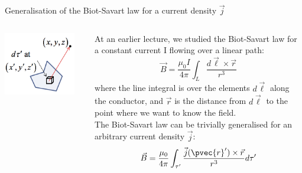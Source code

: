 \begin{frame}{Generalisation of the Biot-Savart law for a current density $\vec{j}$}

\begin{columns}
  \begin{column}{0.40\textwidth}
    \begin{center}
     \includegraphics[width=0.90\textwidth]{./images/schematics/biot_savart_current_density.png}\\
    \end{center}
  \end{column}
  \begin{column}{0.60\textwidth}

     At an earlier lecture, we studied the Biot-Savart law for a constant current I flowing over a linear path:
     \begin{equation*}
            \vec{B} = \frac{\mu_0I}{4\pi} \int_{L} \frac{d\vec{\ell} \times \vec{r}}{r^3}
     \end{equation*}
          where the line integral is over the elements $d\vec{\ell}$ along the conductor, and $\vec{r}$
          is the distance from $d\vec{\ell}$ to the point where we want to know the field.\\
      \vspace{0.2cm}
      The Biot-Savart law can be trivially generalised for an arbitrary current density $\vec{j}$:
    \begin{equation*}
        \vec{B} =
          \frac{\mu_0}{4\pi} \int_{\tau^{\prime}}
             \frac{\vec{j}(\pvec{r}') \times \vec{r}}{r^{3}} d\tau^{\prime}
    \end{equation*}
  \end{column}
\end{columns}


\end{frame}

